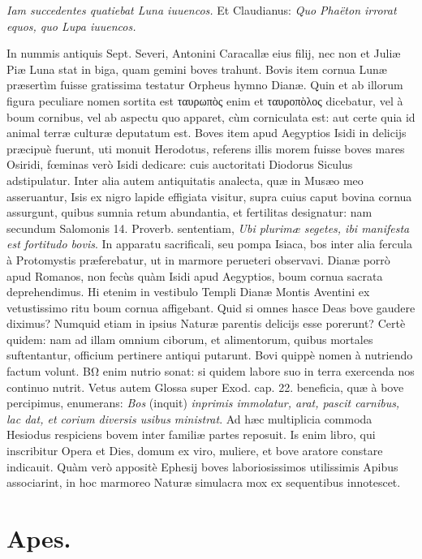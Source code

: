 \documentclass[a4paper, 11pt, oneside, polutonikogreek, latin]{article}
\begin{document}
\emph{Iam succedentes quatiebat Luna iuuencos.} Et Claudianus:
\emph{Quo Phaëton irrorat equos, quo Lupa iuuencos.}

In nummis antiquis Sept. Severi, Antonini Caracallæ eius filij, nec non et Juliæ Piæ Luna stat in biga, quam gemini boves trahunt. Bovis item cornua Lunæ præsertìm fuisse gratissima testatur Orpheus hymno Dianæ. Quin et ab illorum figura peculiare nomen sortita est ταυρωπὸς enim et ταυροπὸλος dicebatur, vel à boum cornibus, vel ab aspectu quo apparet, cùm corniculata est: aut certe quia id animal terræ culturæ deputatum est. Boves item apud Aegyptios Isidi in delicijs præcipuè fuerunt, uti monuit Herodotus, referens illis morem fuisse boves mares Osiridi, fœminas verò Isidi dedicare: cuis auctoritati Diodorus Siculus adstipulatur. Inter alia autem antiquitatis analecta, quæ in Musæo meo asseruantur, Isis ex nigro lapide effigiata visitur, supra cuius caput bovina cornua assurgunt, quibus sumnia retum abundantia, et fertilitas designatur: nam secundum Salomonis 14. Proverb. sententiam, \emph{Ubi plurimæ segetes, ibi manifesta est fortitudo bovis}. In apparatu sacrificali, seu pompa Isiaca, bos inter alia fercula à Protomystis præferebatur, ut in marmore perueteri observavi. Dianæ porrò apud Romanos, non fecùs quàm Isidi apud Aegyptios, boum cornua sacrata deprehendimus. Hi etenim in vestibulo Templi Dianæ Montis Aventini ex vetustissimo ritu boum cornua affigebant. Quid si omnes hasce Deas bove gaudere diximus? Numquid etiam in ipsius Naturæ parentis delicijs esse porerunt? Certè quidem: nam ad illam omnium ciborum, et alimentorum, quibus mortales suftentantur, officium pertinere antiqui putarunt. Bovi quippè nomen à nutriendo factum volunt. BΩ enim nutrio sonat: si quidem labore suo in terra exercenda nos continuo nutrit. Vetus autem Glossa super Exod. cap. 22. beneficia, quæ à bove percipimus, enumerans: \emph{Bos} (inquit) \emph{inprimis immolatur, arat, pascit carnibus, lac dat, et corium diversis usibus ministrat}. Ad hæc multiplicia commoda Hesiodus respiciens bovem inter familiæ partes reposuit. Is enim libro, qui inscribitur Opera et Dies, domum ex viro, muliere, et bove aratore constare indicauit. Quàm verò appositè Ephesij boves laboriosissimos utilissimis Apibus associarint, in hoc marmoreo Naturæ simulacra mox ex sequentibus innotescet.
\clearpage
\section{Apes.}
\end{document}
